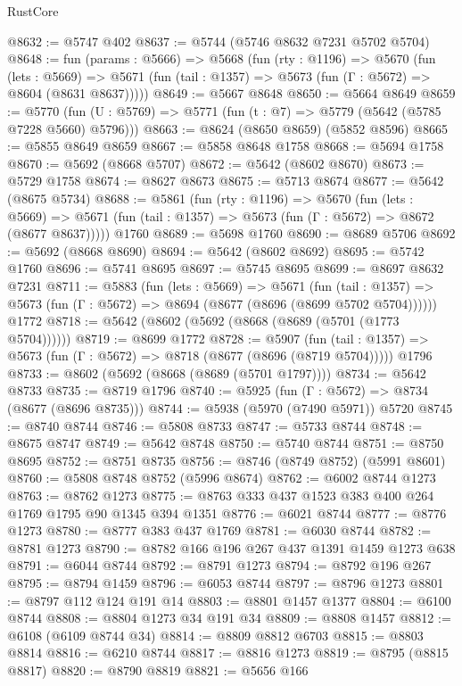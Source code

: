 \begin{lexlean}{RustCore}
\begin{coremodule}
@8632 := @5747 @402
@8637 := @5744 (@5746 @8632 @7231 @5702 @5704)
@8648 := fun (params : @5666) =>
  @5668
    (fun (rty : @1196) =>
    @5670
      (fun (lets : @5669) =>
      @5671 (fun (tail : @1357) => @5673 (fun (Γ : @5672) => @8604 (@8631 @8637)))))
@8649 := @5667 @8648
@8650 := @5664 @8649
@8659 := @5770 (fun (U : @5769) => @5771 (fun (t : @7) => @5779 (@5642 (@5785 @7228 @5660) @5796)))
@8663 := @8624 (@8650 @8659) (@5852 @8596)
@8665 := @5855 @8649 @8659
@8667 := @5858 @8648 @1758
@8668 := @5694 @1758
@8670 := @5692 (@8668 @5707)
@8672 := @5642 (@8602 @8670)
@8673 := @5729 @1758
@8674 := @8627 @8673
@8675 := @5713 @8674
@8677 := @5642 (@8675 @5734)
@8688 := @5861
    (fun (rty : @1196) =>
    @5670
      (fun (lets : @5669) =>
      @5671 (fun (tail : @1357) => @5673 (fun (Γ : @5672) => @8672 (@8677 @8637)))))
    @1760
@8689 := @5698 @1760
@8690 := @8689 @5706
@8692 := @5692 (@8668 @8690)
@8694 := @5642 (@8602 @8692)
@8695 := @5742 @1760
@8696 := @5741 @8695
@8697 := @5745 @8695
@8699 := @8697 @8632 @7231
@8711 := @5883
    (fun (lets : @5669) =>
    @5671
      (fun (tail : @1357) => @5673 (fun (Γ : @5672) => @8694 (@8677 (@8696 (@8699 @5702 @5704))))))
    @1772
@8718 := @5642 (@8602 (@5692 (@8668 (@8689 (@5701 (@1773 @5704))))))
@8719 := @8699 @1772
@8728 := @5907
    (fun (tail : @1357) => @5673 (fun (Γ : @5672) => @8718 (@8677 (@8696 (@8719 @5704)))))
    @1796
@8733 := @8602 (@5692 (@8668 (@8689 (@5701 @1797))))
@8734 := @5642 @8733
@8735 := @8719 @1796
@8740 := @5925 (fun (Γ : @5672) => @8734 (@8677 (@8696 @8735)))
@8744 := @5938 (@5970 (@7490 @5971)) @5720
@8745 := @8740 @8744
@8746 := @5808 @8733
@8747 := @5733 @8744
@8748 := @8675 @8747
@8749 := @5642 @8748
@8750 := @5740 @8744
@8751 := @8750 @8695
@8752 := @8751 @8735
@8756 := @8746 (@8749 @8752) (@5991 @8601)
@8760 := @5808 @8748 @8752 (@5996 @8674)
@8762 := @6002 @8744 @1273
@8763 := @8762 @1273
@8775 := @8763 @333 @437 @1523 @383 @400 @264 @1769 @1795 @90 @1345 @394 @1351
@8776 := @6021 @8744
@8777 := @8776 @1273
@8780 := @8777 @383 @437 @1769
@8781 := @6030 @8744
@8782 := @8781 @1273
@8790 := @8782 @166 @196 @267 @437 @1391 @1459 @1273 @638
@8791 := @6044 @8744
@8792 := @8791 @1273
@8794 := @8792 @196 @267
@8795 := @8794 @1459
@8796 := @6053 @8744
@8797 := @8796 @1273
@8801 := @8797 @112 @124 @191 @14
@8803 := @8801 @1457 @1377
@8804 := @6100 @8744
@8808 := @8804 @1273 @34 @191 @34
@8809 := @8808 @1457
@8812 := @6108 (@6109 @8744 @34)
@8814 := @8809 @8812 @6703
@8815 := @8803 @8814
@8816 := @6210 @8744
@8817 := @8816 @1273
@8819 := @8795 (@8815 @8817)
@8820 := @8790 @8819
@8821 := @5656 @166

\end{coremodule}
\end{lexlean}
